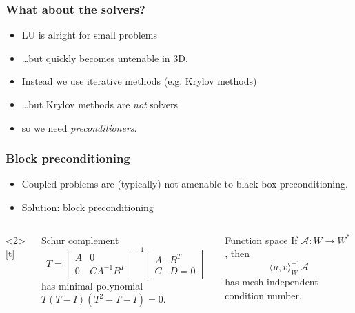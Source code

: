 \documentclass[presentation]{beamer}
\begin{document}
\begin{frame}[t]
  \frametitle{What about the solvers?}
  \begin{itemize}
  \item LU is alright for small problems
  \item \dots but quickly becomes untenable in 3D.
  \item Instead we use iterative methods (e.g. Krylov methods)
  \item<2-> \dots but Krylov methods are \emph{not} solvers
  \item<3-> so we need \emph{preconditioners}.
  \end{itemize}
\end{frame}
\begin{frame}
  \frametitle{Block preconditioning}
  \begin{itemize}
  \item Coupled problems are (typically) not amenable to black
    box preconditioning.
  \item<2-> Solution: block preconditioning
  \end{itemize}
  \begin{columns}<2>[t]
    \begin{column}{0.5\textwidth}
      \begin{block}{Schur complement}
        \begin{equation*}
          T = \begin{bmatrix}
            A & 0 \\
            0 & C A^{-1} B^T
          \end{bmatrix}^{-1}
          \begin{bmatrix}
            A & B^T \\
            C & D = 0
          \end{bmatrix}
        \end{equation*}
        has minimal polynomial $T(T - I)(T^2 - T - I) = 0$.
        \nocite{Murphy:2000,Ipsen:2001,Benzi:2005}
      \end{block}
    \end{column}
    \hspace{1em}
    \begin{column}{0.5\textwidth}
      \begin{block}{Function space}
        If $\mathcal{A} : W \rightarrow W^*$, then
        \begin{equation*}
          \langle u, v \rangle_W^{-1} \mathcal{A}
        \end{equation*}
        has mesh independent condition number.
        \nocite{Malek:2014,Mardal:2011,Kirby:2010}
      \end{block}
    \end{column}
  \end{columns}
\end{frame}
\end{document}
